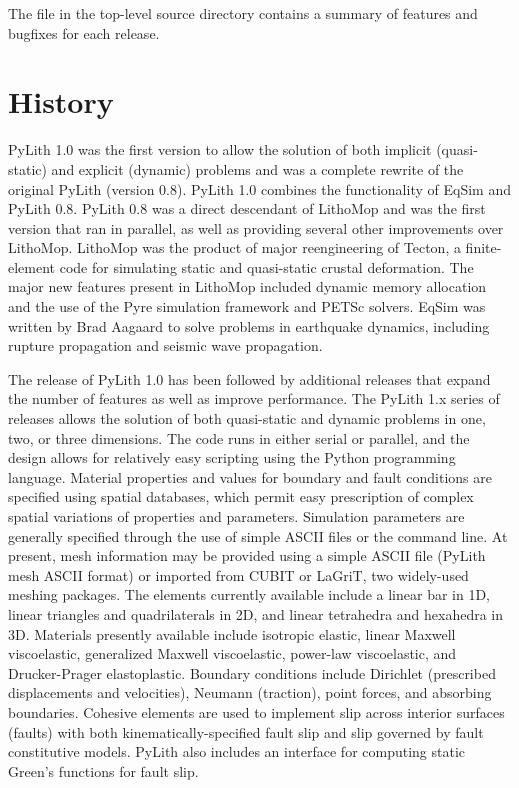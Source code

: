 The  file in the top-level source directory contains
a summary of features and bugfixes for each release.


\section{History}

PyLith 1.0 was the first version to allow the solution of both
implicit (quasi-static) and explicit (dynamic) problems and was a
complete rewrite of the original PyLith (version 0.8). PyLith 1.0
combines the functionality of EqSim
\cite{Aagaard:etal:2001a,Aagaard:etal:2001b} and PyLith 0.8. PyLith
0.8 was a direct descendant of LithoMop and was the first version that
ran in parallel, as well as providing several other improvements over
LithoMop. LithoMop was the product of major reengineering of Tecton, a
finite-element code for simulating static and quasi-static crustal
deformation. The major new features present in LithoMop included
dynamic memory allocation and the use of the Pyre simulation framework
and PETSc solvers. EqSim was written by Brad Aagaard to solve problems
in earthquake dynamics, including rupture propagation and seismic wave
propagation.

The release of PyLith 1.0 has been followed by additional releases
that expand the number of features as well as improve performance.
The PyLith 1.x series of releases allows the solution of both
quasi-static and dynamic problems in one, two, or three
dimensions. The code runs in either serial or parallel, and the design
allows for relatively easy scripting using the Python programming
language. Material properties and values for boundary and fault
conditions are specified using spatial databases, which permit easy
prescription of complex spatial variations of properties and
parameters. Simulation parameters are generally specified through the
use of simple ASCII files or the command line.  At present, mesh
information may be provided using a simple ASCII file (PyLith mesh
ASCII format) or imported from CUBIT or LaGriT, two widely-used
meshing packages. The elements currently available include a linear
bar in 1D, linear triangles and quadrilaterals in 2D, and linear
tetrahedra and hexahedra in 3D. Materials presently available include
isotropic elastic, linear Maxwell viscoelastic, generalized Maxwell
viscoelastic, power-law viscoelastic, and Drucker-Prager
elastoplastic. Boundary conditions include Dirichlet (prescribed
displacements and velocities), Neumann (traction), point forces, and
absorbing boundaries.  Cohesive elements are used to implement slip
across interior surfaces (faults) with both kinematically-specified
fault slip and slip governed by fault constitutive models. PyLith also
includes an interface for computing static Green's functions for fault
slip.


